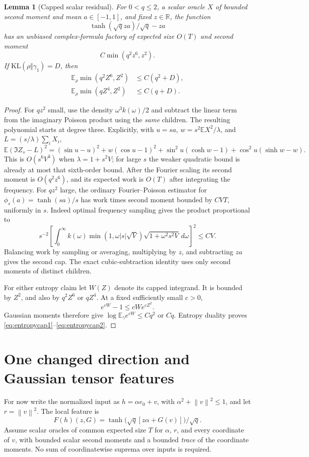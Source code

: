 \documentclass[11pt]{article}
\newtheorem{lemma}[theorem]{Lemma}
\newcommand{\E}{\mathbb E}
\newcommand{\R}{\mathbb R}
\newcommand{\norm}[1]{\left\lVert #1\right\rVert}
\newcommand{\KL}{\mathrm{KL}}
\begin{document}
\begin{lemma}[Capped scalar residual]
\label{lem:cap}
For $0<q\le2$, a scalar oracle $X$ of bounded second moment and mean $a\in[-1,1]$, and fixed $z\in\R$, the function
\[
 \tanh(\sqrt qza)/\sqrt q-za
\]
has an unbiased complex-formula factory of expected size $O(T)$ and second moment
\begin{equation}
 C\min(q^2z^6,z^2).
 \label{eq:cap}
\end{equation}
If $\KL(\rho\Vert\gamma_1)=D$, then
\begin{align}
 \E_\rho\min(q^2Z^6,Z^2)&\le C(q^2+D),\label{eq:entropycap1}\\
 \E_\rho\min(qZ^4,Z^2)&\le C(q+D).\label{eq:entropycap2}
\end{align}
\end{lemma}
\begin{proof}
For $qz^2$ small, use the density $\omega^3k(\omega)/2$ and subtract the linear term from the imaginary Poisson product using the \emph{same} children. The resulting polynomial starts at degree three. Explicitly, with $u=sa$, $w=s^2\E X^2/\lambda$, and $L=(s/\lambda)\sum_iX_i$,
\[
 \E(\Im Z_s-L)^2=(\sin u-u)^2+w(\cos u-1)^2
 +\sin^2u(\cosh w-1)+\cos^2u(\sinh w-w).
\]
This is $O(s^6V^3)$ when $\lambda=1+s^2V$; for large $s$ the weaker quadratic bound is already at most that sixth-order bound. After the Fourier scaling its second moment is $O(q^2z^6)$, and its expected work is $O(T)$ after integrating the frequency. For $qz^2$ large, the ordinary Fourier--Poisson estimator for $\phi_s(a)=\tanh(sa)/s$ has work times second moment bounded by $CVT$, uniformly in $s$. Indeed optimal frequency sampling gives the product proportional to
\[
 s^{-2}\left[\int_0^\infty k(\omega)\min(1,\omega|s|\sqrt V)
                   \sqrt{1+\omega^2s^2V}\,d\omega\right]^2\le CV.
\]
Balancing work by sampling or averaging, multiplying by $z$, and subtracting $za$ gives the second cap. The exact cubic-subtraction identity uses only second moments of distinct children.

For either entropy claim let $W(Z)$ denote its capped integrand. It is bounded by $Z^2$, and also by $q^2Z^6$ or $qZ^4$. At a fixed sufficiently small $c>0$,
\[
 e^{cW}-1\le cW e^{cZ^2}.
\]
Gaussian moments therefore give $\log\E_\gamma e^{cW}\le Cq^2$ or $Cq$. Entropy duality proves \eqref{eq:entropycap1}--\eqref{eq:entropycap2}.
\end{proof}

\section{One changed direction and Gaussian tensor features}
For now write the normalized input as $h=\alpha e_0+v$, with $\alpha^2+\norm v^2\le1$, and let $r=\norm v^2$. The local feature is
\begin{equation}
 F(h)(z,G)=\tanh\bigl(\sqrt q[z\alpha+G(v)]\bigr)/\sqrt q.
 \label{eq:local}
\end{equation}
Assume scalar oracles of common expected size $T$ for $\alpha$, $r$, and every coordinate of $v$, with bounded scalar second moments and a bounded \emph{trace} of the coordinate moments. No sum of coordinatewise suprema over inputs is required.
\end{document}

